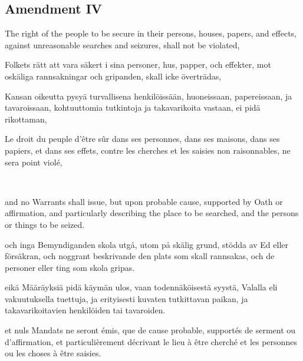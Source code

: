 \documentclass[a4paper,landscape,12pt]{article}
\begin{document}
\subsection*{Amendment IV}
\begin{minipage}[t]{0.22\textwidth}
The right of the people to be secure in their persons, houses, papers, and effects, against unreasonable searches and seizures, shall not be violated,
\end{minipage}\textwidth
\begin{minipage}[t]{0.22\textwidth}
Folkets rätt att vara säkert i sina personer, hus, papper, och effekter, mot oskäliga rannsakningar och gripanden, skall icke överträdas,
\end{minipage}\textwidth
\begin{minipage}[t]{0.22\textwidth}
Kansan oikeutta pysyä turvallisena henkilöissään, huoneissaan, papereissaan, ja tavaroissaan, kohtuuttomia tutkintoja ja takavarikoita vastaan, ei pidä rikottaman,
\end{minipage}\textwidth
\begin{minipage}[t]{0.22\textwidth}
Le droit du peuple d'être sûr dans ses personnes, dans ses maisons, dans ses papiers, et dans ses effets, contre les cherches et les saisies non raisonnables, ne sera point violé, 
\end{minipage}

~

\begin{minipage}[t]{0.22\textwidth}
and no Warrants shall issue, but upon probable cause, supported by Oath or affirmation, and particularly describing the place to be searched, and the persons or things to be seized.
\end{minipage}\textwidth
\begin{minipage}[t]{0.22\textwidth}
och inga Bemyndiganden skola utgå, utom på skälig grund, stödda av Ed eller försäkran, och noggrant beskrivande den plats som skall rannsakas, och de personer eller ting som skola gripas.
\end{minipage}\textwidth
\begin{minipage}[t]{0.22\textwidth}
eikä Määräyksiä pidä käymän ulos, vaan todennäköisestä syystä, Valalla eli vakuutuksella tuettuja, ja erityisesti kuvaten tutkittavan paikan, ja takavarikoitavien henkilöiden tai tavaroiden.
\end{minipage}\textwidth
\begin{minipage}[t]{0.22\textwidth}
et nuls Mandats ne seront émis, que de cause probable, supportés de serment ou d'affirmation, et particulièrement décrivant le lieu à être cherché et les personnes ou les choses à être saisies.
\end{minipage}
\end{document}
